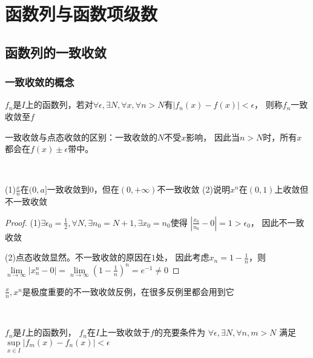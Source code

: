 
\chapter{函数列与函数项级数}

\section{函数列的一致收敛}

\subsection{一致收敛的概念}

\begin{definition}[一致收敛]
  $f_n$是$I$上的函数列，若对$\forall \epsilon, \exists N,\forall x, \forall n > N$有$|f_n(x) - f(x)| < \epsilon$，
  则称$f_n$一致收敛至$f$
\end{definition}

\begin{note}
  一致收敛与点态收敛的区别：一致收敛的$N$不受$x$影响，
  因此当$n > N$时，所有$x$都会在$f(x) \pm \epsilon$带中。
\end{note}

~

\begin{exercise}[定义说明不一致收敛]
  (1)$\frac{x}{n}$在$(0,a]$一致收敛到$0$，但在$(0,+\infty)$不一致收敛
  (2)说明$x^n$在$(0,1)$上收敛但不一致收敛
\end{exercise}

\begin{proof}
  (1)$\exists \epsilon_0 = \frac{1}{2}, \forall N, \exists n_0 = N+1, \exists x_0 = n_0$使得
  $|\frac{x_0}{n_0} - 0| = 1 > \epsilon_0$，
  因此不一致收敛

  (2)点态收敛显然。不一致收敛的原因在$1$处，
  因此考虑$x_n = 1 - \frac{1}{n}$，则$\lim \limits _{n \rightarrow \infty} |x_n^n - 0| = \lim \limits _{n \rightarrow \infty} (1 - \frac{1}{n})^n = e^{-1} \neq 0$
\end{proof}

\begin{note}
  $\frac{x}{n}, x^n$是极度重要的不一致收敛反例，在很多反例里都会用到它
\end{note}

~

\begin{theorem}[Cauchy收敛准则]
  $f_n$是$I$上的函数列，
  $f_n$在$I$上一致收敛于$f$的充要条件为
    $\forall \epsilon, \exists N, \forall n,m > N$
    满足$\sup \limits _{x \in I}|f_m(x) - f_n(x)| < \epsilon$
\end{theorem}

